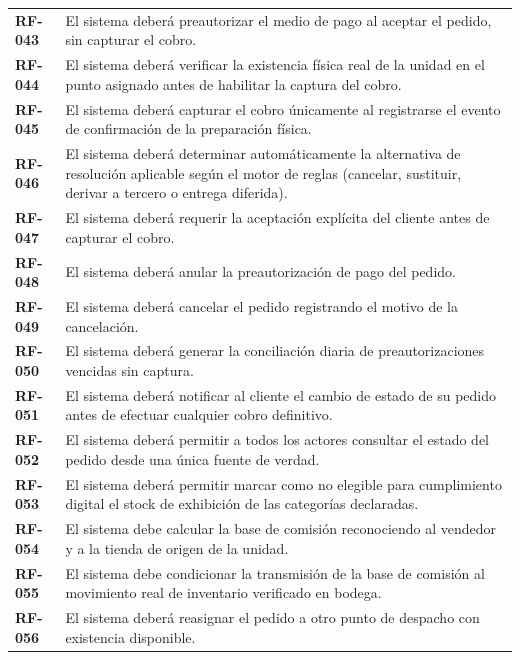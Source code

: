 \documentclass[11pt]{article}
\begin{document}
\begin{longtable}[]{@{}
  >{\raggedright\arraybackslash}p{}
  >{\raggedright\arraybackslash}p{}@{}}
\addlinespace[2pt]
\textbf{RF-043} & El sistema deberá preautorizar el medio de pago al aceptar el pedido, sin capturar el cobro. \\
\addlinespace[2pt]
\textbf{RF-044} & El sistema deberá verificar la existencia física real de la unidad en el punto asignado antes de habilitar la captura del cobro. \\
\addlinespace[2pt]
\textbf{RF-045} & El sistema deberá capturar el cobro únicamente al registrarse el evento de confirmación de la preparación física. \\
\addlinespace[2pt]
\textbf{RF-046} & El sistema deberá determinar automáticamente la alternativa de resolución aplicable según el motor de reglas (cancelar, sustituir, derivar a tercero o entrega diferida). \\
\addlinespace[2pt]
\textbf{RF-047} & El sistema deberá requerir la aceptación explícita del cliente antes de capturar el cobro. \\
\addlinespace[2pt]
\textbf{RF-048} & El sistema deberá anular la preautorización de pago del pedido. \\
\addlinespace[2pt]
\textbf{RF-049} & El sistema deberá cancelar el pedido registrando el motivo de la cancelación. \\
\addlinespace[2pt]
\textbf{RF-050} & El sistema deberá generar la conciliación diaria de preautorizaciones vencidas sin captura. \\
\addlinespace[2pt]
\textbf{RF-051} & El sistema deberá notificar al cliente el cambio de estado de su pedido antes de efectuar cualquier cobro definitivo. \\
\addlinespace[2pt]
\textbf{RF-052} & El sistema deberá permitir a todos los actores consultar el estado del pedido desde una única fuente de verdad. \\
\addlinespace[2pt]
\textbf{RF-053} & El sistema deberá permitir marcar como no elegible para cumplimiento digital el stock de exhibición de las categorías declaradas. \\
\addlinespace[2pt]
\textbf{RF-054} & El sistema debe calcular la base de comisión reconociendo al vendedor y a la tienda de origen de la unidad. \\
\addlinespace[2pt]
\textbf{RF-055} & El sistema debe condicionar la transmisión de la base de comisión al movimiento real de inventario verificado en bodega. \\
\addlinespace[2pt]
\textbf{RF-056} & El sistema deberá reasignar el pedido a otro punto de despacho con existencia disponible. \\

\end{longtable}
\end{document}
